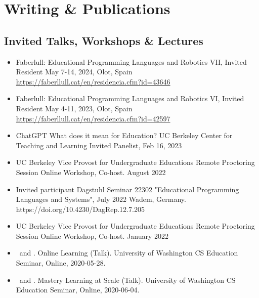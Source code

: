 \section{Writing \& Publications}
\vspace{6pt}

\subsection{Invited Talks, Workshops \& Lectures}

\vspace{5pt}

\begin{itemize}
    \setlength\itemsep{1em}

    \item{Faberlull: Educational Programming Languages and Robotics VII, Invited Resident
    \newline
    May 7-14, 2024, Olot, Spain
    \newline
    \href{https://faberllull.cat/en/residencia.cfm?id=43646&url=educational-programming-and-robotics-2024.htm}{https://faberllull.cat/en/residencia.cfm?id=43646}}

    \item{Faberlull: Educational Programming Languages and Robotics VI, Invited Resident
    \newline
    May 4-11, 2023, Olot, Spain 
    \newline
    \href{https://faberllull.cat/en/residencia.cfm?id=42597\&url=educational-programming-and-robotics-vi.htm}{https://faberllull.cat/en/residencia.cfm?id=42597}}
    
    \item{ChatGPT What does it mean for Education? UC Berkeley Center for Teaching and Learning 
    \newline
    Invited Panelist, Feb 16, 2023}
    
    \item{UC Berkeley Vice Provost for Undergraduate Educations Remote Proctoring Session
    \newline
    Online Workshop, Co-host. August 2022}
    
    \item{Invited participant Dagstuhl Seminar 22302
"Educational Programming Languages and Systems", July 2022 Wadem, Germany.
    \newline
    \small{https://doi.org/10.4230/DagRep.12.7.205}
    }
    
    \item{UC Berkeley Vice Provost for Undergraduate Educations Remote Proctoring Session
    \newline
    Online Workshop, Co-host. January 2022}

    \item{\me\ and \dan. Online Learning (Talk). University of Washington CS Education Seminar, Online, 2020-05-28.}
    
    \item{\me\ and \dan. Mastery Learning at Scale (Talk). University of Washington CS Education Seminar, Online, 2020-06-04.}
\end{itemize}

